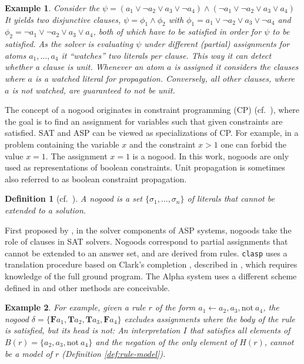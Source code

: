 \documentclass{vutinfth} %
\newtheorem{example}{Example}[chapter]
\newtheorem{definition}{Definition}[chapter]
\newcommand{\bT}{\mathbf{T}}
\newcommand{\bF}{\mathbf{F}}
\newcommand{\headf}{H}
\newcommand{\bodyf}{B}
\newcommand{\fail}{\mathrm{not } \ \xspace}
\newcommand{\from}{\ensuremath{\leftarrow}}
\newcommand{\bsgl}{\sigma}
\newcommand{\clasp}{\texttt{clasp}\xspace}
\begin{document}
\begin{example}
\label{ex:clause-prop}
Consider the $\psi = (a_1 \vee \neg a_2 \vee a_3 \vee \neg a_4) \wedge (\neg a_1 \vee \neg a_2 \vee a_3 \vee a_4)$ It yields two  disjunctive clauses, $\psi = \phi_1 \wedge \phi_2$ with $\phi_1 = a_1 \vee \neg a_2 \vee a_3 \vee \neg a_4$ and $\phi_2 = \neg a_1 \vee \neg a_2 \vee a_3 \vee a_4$, both of which have to be satisfied in order for $\psi$ to be satisfied. As the solver is evaluating $\psi$ under different (partial) assignments for atoms $a_1, \ldots, a_4$ it \enquote{watches} two literals per clause. This way it can detect whether a clause is unit. Whenever an atom $a$ is assigned it considers the clauses where $a$ is a watched literal for propagation. Conversely, all other clauses, where $a$ is not watched, are guaranteed to not be unit.
\end{example}

The concept of a nogood originates in constraint programming (CP) (cf.~\cite{clasp,handbook-cp,handbook-kr-cp}), where the goal is to find an assignment for variables such that given constraints are satisfied. SAT and ASP can be viewed as specializations of CP. For example, in a problem containing the variable $x$ and the constraint $x > 1$ one can forbid the value $x = 1$. The assignment $x = 1$ is a nogood. In this work, nogoods are only used as representations of boolean constraints. Unit propagation is sometimes also referred to as boolean constraint propagation.

\begin{definition}[cf.~\cite{handbook-cp}]
\label{def:nogood}
A \emph{nogood} is a set $\{ \bsgl_1, \ldots, \bsgl_n \}$ of literals that cannot be extended to a solution.
\end{definition}

First proposed by \citet{clasp-first}, in the solver components of ASP systems, nogoods take the role of clauses in SAT solvers. Nogoods correspond to partial assignments that cannot be extended to an answer set, and are derived from rules. \clasp uses a translation procedure based on Clark's completion \cite{clark}, described in \cite[Section 3]{clasp}, which requires knowledge of the full ground program. The Alpha system uses a different scheme defined in \cite[Definition 5]{blend} and other methods are conceivable.

\begin{example}
\label{ex:rule-to-nogood}
For example, given a rule $r$ of the form $a_1 \from a_2, a_3, \fail a_4$, the nogood $\delta = \{\bF a_1, \bT a_2, \bT a_3, \bF a_4 \}$ excludes assignments where the body of the rule is satisfied, but its head is not: An interpretation $I$ that satisfies all elements of $\bodyf(r) = \{a_2, a_3, \fail a_4 \}$ and the negation of the only element of $\headf(r)$, cannot be a model of $r$ (Definition \ref{def:rule-model}).
\end{example}
\end{document}
